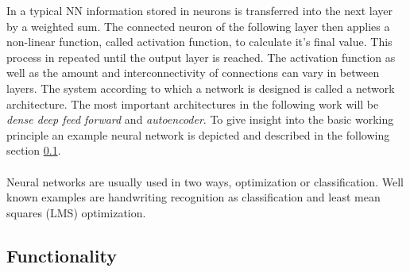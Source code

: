 			In a typical NN information stored in neurons is transferred into the next layer by a weighted sum. The connected neuron of the following layer then applies a non-linear function, called activation function, to calculate it's final value. This process in repeated until the output layer is reached. The activation function as well as the amount and interconnectivity of connections can vary in between layers. The system according to which a network is designed is called a network architecture. The most important architectures in the following work will be \textit{dense deep feed forward} and \textit{autoencoder}. To give insight into the basic working principle an example neural network is depicted and described in the following section \ref{NNExample}.\\
			~\\
			Neural networks are usually used in two ways, optimization or classification. Well known examples are handwriting recognition as classification and least mean squares (LMS) optimization. %
		\subsection{Functionality}
			\label{NNExample}
			
